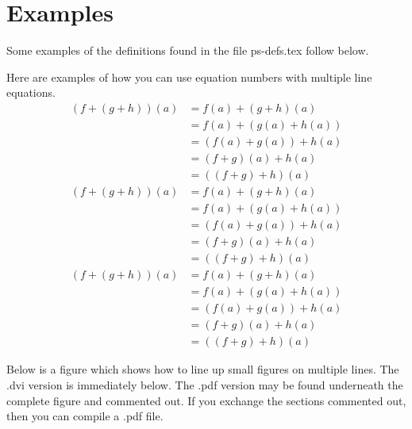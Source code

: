 \chapter{Examples}  %

Some examples of the definitions found in the file ps-defs.tex follow below.

%
Here are examples of how you can use equation numbers with multiple line equations.
\begin{align}			%
(f+(g+h))(a)&=f(a)+(g+h)(a)  \nonumber \\
& =f(a)+(g(a)+h(a))   \\
& =(f(a)+g(a))+h(a)  \nonumber \\
& = (f+g)(a)+h(a)  \nonumber \\
& =((f+g)+h)(a)
\end{align}
%
\begin{equation}			%
\begin{aligned}
(f+(g+h))(a)&=f(a)+(g+h)(a)  \\
& =f(a)+(g(a)+h(a))  \\
& =(f(a)+g(a))+h(a)   \\
& = (f+g)(a)+h(a)   \\
& =((f+g)+h)(a)	
\end{aligned}
\end{equation}  
%
\[					%
\begin{aligned}			
(f+(g+h))(a)&=f(a)+(g+h)(a)\\
& =f(a)+(g(a)+h(a))\\
& =(f(a)+g(a))+h(a)\\
& = (f+g)(a)+h(a)\\
& =((f+g)+h)(a)
\end{aligned}
\]

Below is a figure which shows how to line up small figures on multiple lines.
The .dvi version is immediately below.  The .pdf version may be found underneath the complete figure and commented out.  If you exchange the sections commented out, then you can compile a .pdf file. \\ 

